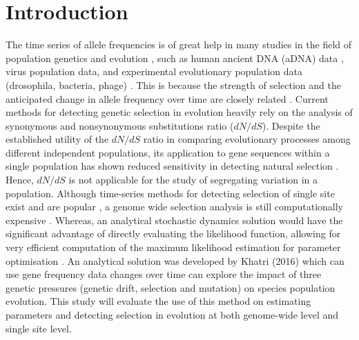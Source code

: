 \documentclass[12pt]{article}
\begin{document}
\section{Introduction}
The time series of allele frequencies is of great help in many studies in the field of population genetics and evolution \citep{bollback2008estimation}, such as human ancient DNA (aDNA) data \citep{hummel2005detection}, virus population data\citep{shankarappa1999consistent}, and experimental evolutionary population data (drosophila, bacteria, phage) \citep{buri1956gene, woods2006tests, bollback2007clonal}. This is because the strength of selection and the anticipated change in allele frequency over time are closely related \citep{bollback2008estimation}. Current methods for detecting genetic selection in evolution heavily rely on the analysis of synonymous and nonsynonymous substitutions ratio ($dN/dS$). Despite the established utility of the $dN/dS$ ratio in comparing evolutionary processes among different independent populations, its application to gene sequences within a single population has shown reduced sensitivity in detecting natural selection \citep{kryazhimskiy2008population}. Hence, $dN/dS$ is not applicable for the study of segregating variation in a population. Although time-series methods for detecting selection of single site exist and are popular \citep{bollback2008estimation, malaspinas2012estimating, tataru2015inference}, a genome wide selection analysis is still computationally expensive \cite{khatri2016quantifying}. Whereas, an analytical stochastic dynamics solution would have the significant advantage of directly evaluating the likelihood function, allowing for very efficient computation of the maximum likelihood estimation for parameter optimisation \citep{khatri2016quantifying}. An analytical solution was developed by Khatri (2016) which can use gene frequency data changes over time can explore the impact of three genetic pressures (genetic drift, selection and mutation) on species population evolution. This study will evaluate the use of this method on estimating parameters and detecting selection in evolution at both genome-wide level and single site level.\\
\end{document}
